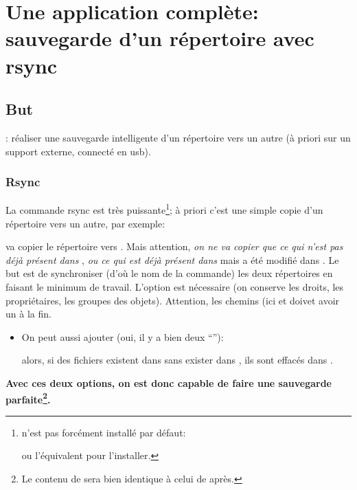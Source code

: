 \section{Une application complète: sauvegarde d'un répertoire avec
  rsync}



\subsection*{But}: réaliser une sauvegarde \og intelligente \fg{} d'un
répertoire vers un autre (à priori sur un support externe, connecté en
usb).

\subsubsection*{Rsync} La commande rsync est très
puissante\footnote{ n'est pas forcément installé par
  défaut:


  ou l'équivalent pour l'installer.}; à priori
c'est une simple copie d'un répertoire vers un autre, par exemple:


va copier le répertoire  vers . Mais
attention, \emph{on ne va copier que ce qui n'est pas déjà présent dans}
, \emph{ou ce qui est déjà présent dans} 
 {mais a été modifié dans}
.  Le but est de synchroniser (d'où le nom de la
commande) les deux répertoires en  faisant le minimum de
travail. L'option  est nécessaire (on conserve les droits, les
propriétaires, les groupes des objets). Attention, les chemins (ici
 et   doivet avoir un \ttt{/} à la fin.

\begin{itemize}
\item On peut aussi ajouter  (oui, il y a bien
  deux ``\ttt{-}''): 


  alors, si des fichiers existent dans  sans exister
  dans , ils sont effacés dans .
\end{itemize}
  
  \textbf{Avec ces deux options, on est donc capable de faire une
    sauvegarde parfaite\footnote{Le contenu de  sera
      bien identique à celui de  après.}.}
  
